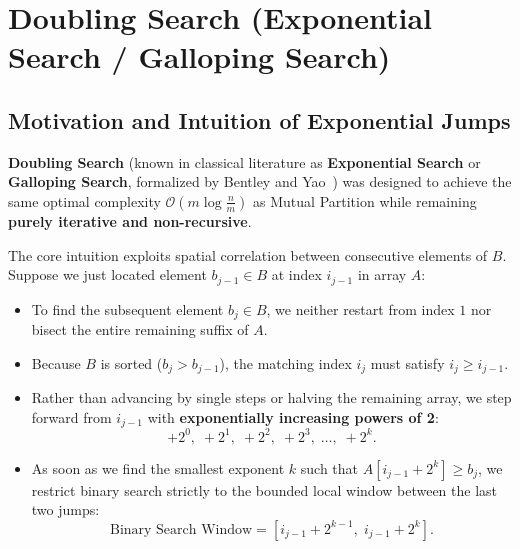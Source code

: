 \FloatBarrier
\section{Doubling Search (Exponential Search / Galloping Search)}
\label{sec:doubling-search-en}

\subsection{Motivation and Intuition of Exponential Jumps}
\textbf{Doubling Search} (known in classical literature as \textbf{Exponential Search} or \textbf{Galloping Search}, formalized by Bentley and Yao~\cite{bentley1976}) was designed to achieve the same optimal complexity $\mathcal{O}(m \log \frac{n}{m})$ as Mutual Partition while remaining \textbf{purely iterative and non-recursive}.

The core intuition exploits spatial correlation between consecutive elements of $B$. Suppose we just located element $b_{j-1} \in B$ at index $i_{j-1}$ in array $A$:
\begin{itemize}
  \item To find the subsequent element $b_j \in B$, we neither restart from index $1$ nor bisect the entire remaining suffix of $A$.
  \item Because $B$ is sorted ($b_j > b_{j-1}$), the matching index $i_j$ must satisfy $i_j \ge i_{j-1}$.
  \item Rather than advancing by single steps or halving the remaining array, we step forward from $i_{j-1}$ with \textbf{exponentially increasing powers of 2}:
  \begin{equation}
    +2^0, \; +2^1, \; +2^2, \; +2^3, \; \dots, \; +2^k.
  \end{equation}
  \item As soon as we find the smallest exponent $k$ such that $A[i_{j-1} + 2^k] \ge b_j$, we restrict binary search strictly to the bounded local window between the last two jumps:
  \begin{equation}
    \text{Binary Search Window} = \left[i_{j-1} + 2^{k-1}, \; i_{j-1} + 2^k\right].
  \end{equation}
\end{itemize}


